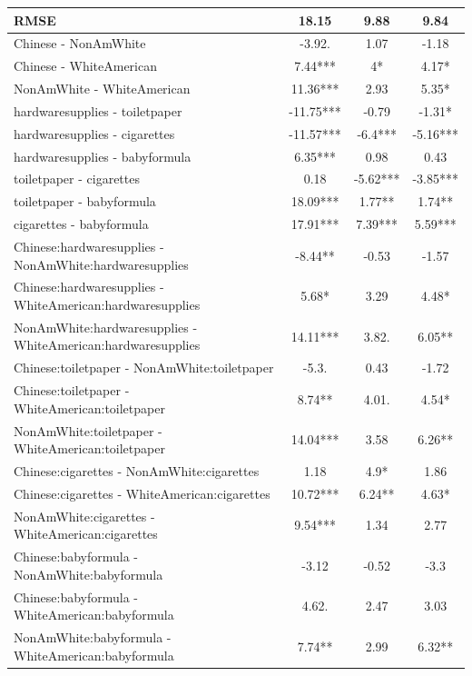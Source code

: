 \documentclass[]{report}
\begin{document}
\begin{table}
{\begin{tabular}[t]{lccc}
			RMSE & \num{18.15} & \num{9.88} & \num{9.84}\\
			\bottomrule
		Chinese - NonAmWhite & -3.92. & 1.07 & -1.18 \\ 
		Chinese - WhiteAmerican & 7.44*** & 4* & 4.17* \\ 
		NonAmWhite - WhiteAmerican & 11.36*** & 2.93 & 5.35* \\ 
		hardwaresupplies - toiletpaper & -11.75*** & -0.79 & -1.31* \\ 
		hardwaresupplies - cigarettes & -11.57*** & -6.4*** & -5.16*** \\ 
		hardwaresupplies - babyformula & 6.35*** & 0.98 & 0.43 \\ 
		toiletpaper - cigarettes & 0.18 & -5.62*** & -3.85*** \\ 
		toiletpaper - babyformula & 18.09*** & 1.77** & 1.74** \\ 
		cigarettes - babyformula & 17.91*** & 7.39*** & 5.59*** \\ 
		Chinese:hardwaresupplies - NonAmWhite:hardwaresupplies & -8.44** & -0.53 & -1.57 \\ 
		Chinese:hardwaresupplies - WhiteAmerican:hardwaresupplies & 5.68* & 3.29 & 4.48* \\ 
		NonAmWhite:hardwaresupplies - WhiteAmerican:hardwaresupplies & 14.11*** & 3.82. & 6.05** \\ 
		Chinese:toiletpaper - NonAmWhite:toiletpaper & -5.3. & 0.43 & -1.72 \\ 
		Chinese:toiletpaper - WhiteAmerican:toiletpaper & 8.74** & 4.01. & 4.54* \\ 
		NonAmWhite:toiletpaper - WhiteAmerican:toiletpaper & 14.04*** & 3.58 & 6.26** \\ 
		Chinese:cigarettes - NonAmWhite:cigarettes & 1.18 & 4.9* & 1.86 \\ 
		Chinese:cigarettes - WhiteAmerican:cigarettes & 10.72*** & 6.24** & 4.63* \\ 
		NonAmWhite:cigarettes - WhiteAmerican:cigarettes & 9.54*** & 1.34 & 2.77 \\ 
		Chinese:babyformula - NonAmWhite:babyformula & -3.12 & -0.52 & -3.3 \\ 
		Chinese:babyformula - WhiteAmerican:babyformula & 4.62. & 2.47 & 3.03 \\ 
		NonAmWhite:babyformula - WhiteAmerican:babyformula & 7.74** & 2.99 & 6.32** \\ 
			\hline
		\end{tabular}}
	\end{table}
	
\end{document}
